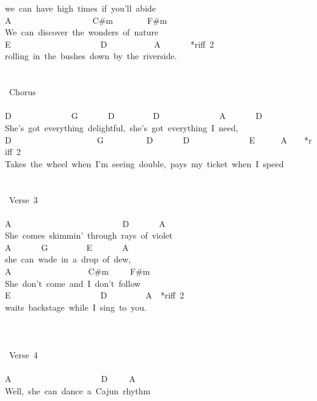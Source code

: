 {we\ can\ have\ high\ times\ if\ you'll\ abide\\
A\ \ \ \ \ \ \ \ \ \ \ \ \ \ \ \ \ \ \ C\#m\ \ \ \ \ \ \ \ F\#m\\
We\ can\ discover\ the\ wonders\ of\ nature\\
E\ \ \ \ \ \ \ \ \ \ \ \ \ \ \ \ \ \ \ \ \ D\ \ \ \ \ \ \ \ \ \ \ A\ \ \ \ \ \ \ *riff\ 2\\
rolling\ in\ the\ bushes\ down\ by\ the\ riverside.\\
\\
\\
\lbrack\ Chorus\rbrack\\
\\
D\ \ \ \ \ \ \ \ \ \ \ \ \ \ G\ \ \ \ \ \ \ D\ \ \ \ \ \ \ \ \ D\ \ \ \ \ \ \ \ \ \ \ \ \ \ A\ \ \ \ \ \ \ D\\
She's\ got\ everything\ delightful,\ she's\ got\ everything\ I\ need,\\
D\ \ \ \ \ \ \ \ \ \ \ \ \ \ \ \ \ \ \ \ G\ \ \ \ \ \ \ \ \ \ D\ \ \ \ \ \ \ D\ \ \ \ \ \ \ \ \ \ \ \ \ \ E\ \ \ \ \ \ A\ \ \ \ *riff\ 2\\
Takes\ the\ wheel\ when\ I'm\ seeing\ double,\ pays\ my\ ticket\ when\ I\ speed\\
\\
\\
\lbrack\ Verse\ 3\rbrack\\
\\
A\ \ \ \ \ \ \ \ \ \ \ \ \ \ \ \ \ \ \ \ \ \ \ \ \ \ D\ \ \ \ \ \ \ A\\
She\ comes\ skimmin'\ through\ rays\ of\ violet\\
A\ \ \ \ \ \ \ G\ \ \ \ \ \ \ \ \ E\ \ \ \ \ \ \ A\\
she\ can\ wade\ in\ a\ drop\ of\ dew,\\
A\ \ \ \ \ \ \ \ \ \ \ \ \ \ \ \ \ \ C\#m\ \ \ \ \ F\#m\\
She\ don't\ come\ and\ I\ don't\ follow\\
E\ \ \ \ \ \ \ \ \ \ \ \ \ \ \ \ \ \ \ \ \ D\ \ \ \ \ \ \ \ \ A\ \ *riff\ 2\\
waits\ backstage\ while\ I\ sing\ to\ you.\\
\\
\\
\\
\lbrack\ Verse\ 4\rbrack\\
\\
A\ \ \ \ \ \ \ \ \ \ \ \ \ \ \ \ \ \ \ \ \ D\ \ \ \ \ A\\
Well,\ she\ can\ dance\ a\ Cajun\ rhythm\\
}
